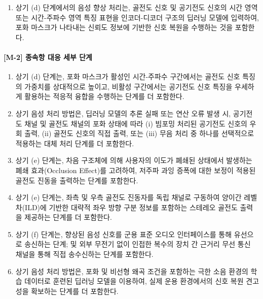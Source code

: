 \documentclass{article}
\DeclareRobustCommand{\codexedit}[1]{\textcolor{customorange}{#1}}
\begin{document}
\begin{enumerate}[label = \textbf{(M.1.\arabic*)}]
    \item 상기 (d) 단계에서의 음성 향상 처리는, 골전도 신호 및 공기전도 신호의 시간 영역 또는 시간-주파수 영역 특징 표현을 인코더-디코더 구조의 딥러닝 모델에 입력하여, 포화 마스크가 나타내는 신뢰도 정보에 기반한 신호 복원을 수행하는 것을 포함한다.

\end{enumerate}


\paragraph{[M-2] 종속항 대응 세부 단계}

\begin{enumerate}[label = \textbf{(M.2.\arabic*)}]

    \item 상기 (d) 단계는, 포화 마스크가 활성인
    시간-주파수 구간에서는 골전도 신호 특징의 가중치를
    상대적으로 높이고, 비활성 구간에서는 공기전도 신호
    특징을 우세하게 활용하는 적응적 융합을 수행하는
    단계를 더 포함한다.

    \item \codexedit{상기 음성 처리 방법은, 딥러닝 모델의 추론
    실패 또는 연산 오류 발생 시, 공기전도 채널 및 골전도 채널의 포화 상태에 따라 (i) 빔포밍 처리된 공기전도 신호의 우회 출력, (ii) 골전도 신호의 직접 출력, 또는 (iii) 무음 처리 중 하나를 선택적으로 적용하는 대체 처리 단계를 더 포함한다.}

    \item 상기 (e) 단계는, 차음 구조체에 의해 사용자의
    이도가 폐쇄된 상태에서 발생하는 폐쇄 효과(Occlusion Effect)를 고려하여, 저주파 과잉 증폭에 대한 보정이 적용된 골전도
    진동을 출력하는 단계를 포함한다.

    \item 상기 (e) 단계는, 좌측 및 우측 골전도 진동자를
    독립 채널로 구동하여 양이간 레벨차(ILD)에 기반한 대략적 좌우 방향 구분 정보를 포함하는 스테레오 골전도 출력을
    제공하는 단계를 더 포함한다.

    \item 상기 (f) 단계는, 향상된 음성 신호를 군용
    표준 오디오 인터페이스를 통해 유선으로 송신하는
    단계; 및 외부 무전기 없이 인접한 복수의 장치
    간 근거리 무선 통신 채널을 통해 직접 송수신하는
    단계를 포함한다.

    \item 상기 음성 처리 방법은, 포화 및 비선형 왜곡
    조건을 포함하는 극한 소음 환경의 학습 데이터로
    훈련된 딥러닝 모델을 이용하여, 실제 운용 환경에서의
    신호 복원 견고성을 확보하는 단계를 더 포함한다.


\end{enumerate}
\end{document}
